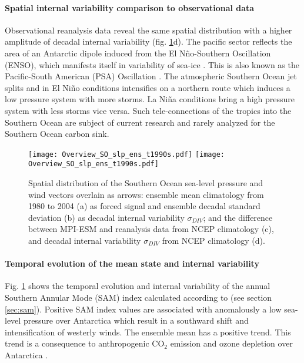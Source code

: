 \documentclass[12pt]{article}
\begin{document}
\paragraph{Spatial internal variability comparison to observational data}
Observational reanalysis data reveal the same spatial distribution with a higher amplitude of decadal internal variability (fig. \ref{fig:SO_winds_ensmean_ensstd}d). The pacific sector reflects the area of an Antarctic dipole induced from the El N\~{n}o-Southern Oscillation (ENSO), which manifests itself in variability of sea-ice \citep{Yuan2004}. This is also known as the Pacific-South American (PSA) Oscillation \citep{Sallee2008}. The atmospheric Southern Ocean jet splits and in El Ni\~{n}o conditions intensifies on a northern route which induces a low pressure system with more storms. La Ni\~{n}a conditions bring a high pressure system with less storms vice versa. Such tele-connections of the tropics into the Southern Ocean are subject of current research and rarely analyzed for the Southern Ocean carbon sink.  


\begin{figure}[h!]
	\centering
	\texttt{[image: Overview\_SO\_slp\_ens\_t1990s.pdf]} %
	\texttt{[image: Overview\_SO\_slp\_ens\_t1990s.pdf]} %
	\caption{Spatial distribution of the Southern Ocean sea-level pressure and wind vectors overlain as arrows: ensemble mean climatology from 1980 to 2004 (a) as forced signal and ensemble decadal standard deviation (b) as decadal internal variability $\sigma_{DIV}$; and the difference between MPI-ESM and reanalysis data from NCEP climatology \citep{Kalnay1996} (c), and decadal internal variability $\sigma_{DIV}$ from NCEP climatology (d).}
	\label{fig:SO_winds_ensmean_ensstd}
\end{figure}

\paragraph{Temporal evolution of the mean state and internal variability}
Fig. \ref{fig:SO_winds_ensmean_ensstd} shows the temporal evolution and internal variability of the annual Southern Annular Mode (SAM) index calculated according to \citep{Gong1999} (see section \ref{sec:sam}). Positive SAM index values are associated with anomalously a low sea-level pressure over Antarctica which result in a southward shift and intensification of westerly winds. The ensemble mean has a positive trend. This trend is a consequence to anthropogenic CO$_2$ emission and ozone depletion over Antarctica \citep{Thompson2000}.
\end{document}
